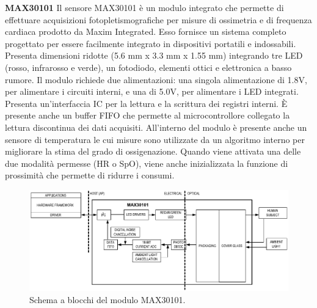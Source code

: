 \textbf{MAX30101} Il sensore MAX30101 è un modulo integrato che permette di effettuare acquisizioni fotopletismografiche per misure di ossimetria e di frequenza cardiaca prodotto da Maxim Integrated\cite{IntegratedMAX30101}. Esso fornisce un sistema completo progettato per essere facilmente integrato in dispositivi portatili e indossabili. Presenta dimensioni ridotte (5.6 mm x 3.3 mm x 1.55 mm) integrando tre LED (rosso, infrarosso e verde), un fotodiodo, elementi ottici e elettronica a basso rumore. Il modulo richiede due alimentazioni: una singola alimentazione di 1.8V, per alimentare i circuiti interni, e una di 5.0V, per alimentare i LED integrati. Presenta un'interfaccia IC per la lettura e la scrittura dei registri interni. \`E presente anche un buffer FIFO che permette al microcontrollore collegato la lettura discontinua dei dati acquisiti. All'interno del modulo è presente anche un sensore di temperatura le cui misure sono utilizzate da un algoritmo interno per migliorare la stima del grado di ossigenazione. Quando viene attivata una delle due modalità permesse (HR o SpO), viene anche inizializzata la funzione di prossimità che permette di ridurre i consumi.   
\begin{figure}[tb]
	\centering
	\includegraphics[width=1\linewidth]{ImageFiles/Fotopletismografia/MAX30101BlockDiagram}
	\caption{Schema a blocchi del modulo MAX30101.}
	\label{fig:MAX30101BlockDiagram}
\end{figure}

\pagebreak


